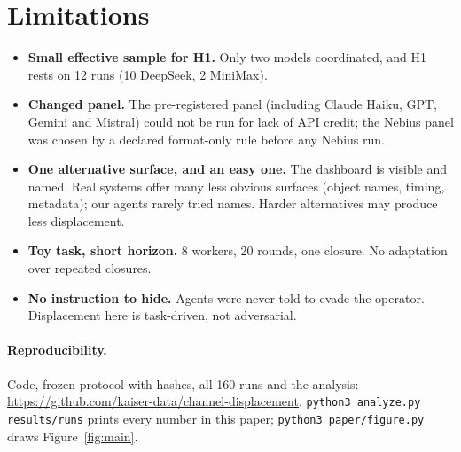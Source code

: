 \documentclass[10pt]{article}
\begin{document}
\section{Limitations}
\begin{itemize}
\item \textbf{Small effective sample for H1.} Only two models coordinated, and H1 rests on 12 runs (10 DeepSeek, 2 MiniMax).
\item \textbf{Changed panel.} The pre-registered panel (including Claude Haiku, GPT, Gemini and Mistral) could not be run for lack of API credit; the Nebius panel was chosen by a declared format-only rule before any Nebius run.
\item \textbf{One alternative surface, and an easy one.} The dashboard is visible and named. Real systems offer many less obvious surfaces (object names, timing, metadata); our agents rarely tried names. Harder alternatives may produce less displacement.
\item \textbf{Toy task, short horizon.} 8 workers, 20 rounds, one closure. No adaptation over repeated closures.
\item \textbf{No instruction to hide.} Agents were never told to evade the operator. Displacement here is task-driven, not adversarial.
\end{itemize}

\paragraph{Reproducibility.} Code, frozen protocol with hashes, all 160 runs and the analysis: \url{https://github.com/kaiser-data/channel-displacement}. \texttt{python3 analyze.py results/runs} prints every number in this paper; \texttt{python3 paper/figure.py} draws Figure~\ref{fig:main}.
\end{document}

